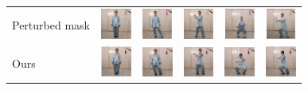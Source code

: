 \documentclass{article}
\begin{document}
\begin{table}[t]
\begin{center}
\begin{small}
\begin{sc}
\begin{tabular}{m{1cm}m{1cm}m{1cm}m{1cm}m{1cm}m{1cm}}
Perturbed mask & \includegraphics[width=1cm, height=1cm]{images/4_YOAV_1.JPG} &
\includegraphics[width=1cm, height=1cm]{images/4_YOAV_2.JPG} &
\includegraphics[width=1cm, height=1cm]{images/4_YOAV_3.JPG} &
\includegraphics[width=1cm, height=1cm]{images/4_YOAV_4.JPG} &
\includegraphics[width=1cm, height=1cm]{images/4_YOAV_5.JPG} \\
Ours & \includegraphics[width=1cm, height=1cm]{images/5_OURS_1.JPG} &
\includegraphics[width=1cm, height=1cm]{images/5_OURS_2.JPG} &
\includegraphics[width=1cm, height=1cm]{images/5_OURS_3.JPG} &
\includegraphics[width=1cm, height=1cm]{images/5_OURS_4.JPG} &
\includegraphics[width=1cm, height=1cm]{images/5_OURS_5.JPG} \\
\bottomrule
\end{tabular}
\end{sc}
\end{small}
\end{center}
\vskip -0.1in
\end{table}
\end{document}
